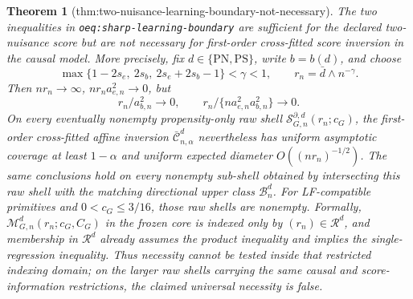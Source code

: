 \documentclass{article}
\newtheorem{theorem}{Theorem}
\begin{document}
\begin{theorem}[thm:two-nuisance-learning-boundary-not-necessary]\label{thm:two-nuisance-learning-boundary-not-necessary}
The two inequalities in \texttt{oeq:sharp-learning-boundary} are sufficient for the declared two-nuisance score but are not necessary for first-order cross-fitted score inversion in the causal model. More precisely, fix \(d\in\{\mathrm{PN},\mathrm{PS}\}\), write \(b=b(d)\), and choose
\[\max\{1-2s_e,\ 2s_b,\ 2s_e+2s_b-1\}<\gamma<1,\qquad r_n=\bar d\wedge n^{-\gamma}.\]
Then \(nr_n\to\infty\), \(nr_na_{e,n}^2\to0\), but
\[r_n/a_{b,n}^2\to0,\qquad r_n/\{na_{e,n}^2a_{b,n}^2\}\to0.\]
On every eventually nonempty propensity-only raw shell \(\mathcal S_{G,n}^{\partial,d}(r_n;c_G)\), the first-order cross-fitted affine inversion \(\bar{\mathcal C}_{n,\alpha}^d\) nevertheless has uniform asymptotic coverage at least \(1-\alpha\) and uniform expected diameter \(O((nr_n)^{-1/2})\). The same conclusions hold on every nonempty sub-shell obtained by intersecting this raw shell with the matching directional upper class \(\mathcal B_n^d\). For LF-compatible primitives and \(0<c_G\le3/16\), those raw shells are nonempty. Formally, \(\mathcal M_{G,n}^d(r_n;c_G,C_G)\) in the frozen core is indexed only by \((r_n)\in\mathcal R^d\), and membership in \(\mathcal R^d\) already assumes the product inequality and implies the single-regression inequality. Thus necessity cannot be tested inside that restricted indexing domain; on the larger raw shells carrying the same causal and score-information restrictions, the claimed universal necessity is false.
\end{theorem}
\end{document}
